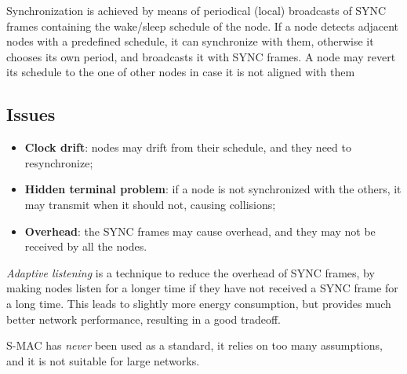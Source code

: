 Synchronization is achieved by means of periodical (local)
broadcasts of SYNC frames containing the wake/sleep schedule of the node.
If a node detects adjacent nodes with a predefined schedule, it can synchronize with them, otherwise it chooses its own period, and broadcasts it with SYNC frames.
A node may revert its schedule to the one of other nodes in case it is not aligned with them

\subsection{Issues}
\begin{itemize}
   \item \textbf{Clock drift}: nodes may drift from their schedule, and they need to resynchronize;
   \item \textbf{Hidden terminal problem}: if a node is not synchronized with the others, it may transmit when it should not, causing collisions;
   \item \textbf{Overhead}: the SYNC frames may cause overhead, and they may not be received by all the nodes.
\end{itemize}

\textit{Adaptive listening} is a technique to reduce the overhead of SYNC frames, by making nodes listen for a longer time if they have not received a SYNC frame for a long time. This leads to slightly more energy consumption, but provides much better network performance, resulting in a good tradeoff.

S-MAC has \textit{never} been used as a standard, it relies on too many assumptions, and it is not suitable for large networks.

